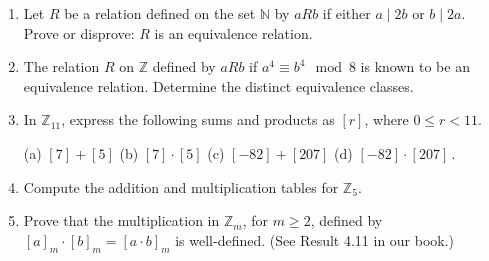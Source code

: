 \documentclass[12pt]{article}
\newcommand{\NN}{{\mathbb N}}  %
\newcommand{\ZZ}{{\mathbb Z}}  %
\begin{document}
\begin{enumerate}

\item Let $R$ be a relation defined on the set $\NN$ by $a R b$ if either $a \mid 2b$ or $b \mid 2a$.
       Prove or disprove: $R$ is an equivalence relation.


 
  
\item The relation $R$ on $\ZZ$ defined by $a R b$ if $a^4 \equiv b^4 \mod 8$ is known to be an equivalence relation.
  Determine the distinct equivalence classes.

\item In $\ZZ_{11}$, express the following sums and products as $[r]$, where $0\leq r < 11$.
  
  (a) $[7] + [5]$ \quad
  (b) $[7]\cdot [5]$ \quad
  (c) $[−82] + [207]$ \quad
  (d) $[−82] \cdot [207]$\,.
  
\item Compute the addition and multiplication tables for $\ZZ_5$.
  

\item Prove that the multiplication in $\ZZ_m$, for $m\geq 2$, defined by $[a]_m\cdot[b]_m=[a\cdot b]_m$ is well-defined.
          (See Result 4.11 in our book.)

    

  
\end{enumerate}
\end{document}
